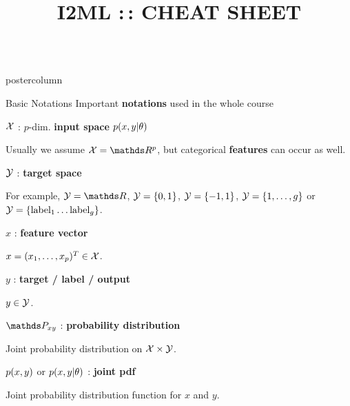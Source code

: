 \documentclass{beamer}
\title{I2ML :\,: CHEAT SHEET} %
\newlength{\columnheight} %
\begin{document}
\begin{frame}[fragile]{}
\begin{columns}
	\begin{column}{.31\textwidth}
		\begin{beamercolorbox}[center]{postercolumn}
			\begin{minipage}{.98\textwidth}
				\parbox[t][\columnheight]{\textwidth}{				
					\begin{myblock}{Basic Notations}
						Important \textbf{notations} used in the whole course  
						\\
						\begin{codebox}
						    $\mathcal{X}$ : $p$-dim. \textbf{input space} $p(x, y | \theta)$
						\end{codebox}
						\hspace*{1ex}Usually we assume $\Xspace = \R^p$, but categorical \textbf{features} can occur as well.
						\\
						\begin{codebox}
							$\mathcal{Y}$ : \textbf{target space}
						\end{codebox}
						\hspace*{1ex}For example, $\Yspace = \R$, $\mathcal{Y} = \lbrace 0, 1 \rbrace$, $\mathcal{Y} = \lbrace -1, 1 \rbrace$, $\mathcal{Y} = \{1, \ldots, g\}$ or \hspace*{1ex}$\mathcal{Y} = \lbrace \textrm{label}_1 \ldots \textrm{label}_g \rbrace$.
						\\
						\begin{codebox}
							$x$ : \textbf{feature vector}
						\end{codebox}
						\hspace*{1ex}$x = (x_1, \ldots, x_p)^T \in \mathcal{X}$.
						\\
						\begin{codebox}
							$y$ : \textbf{target / label / output}
						\end{codebox}
						\hspace*{1ex}$y \in \mathcal{Y}$.
						\\
						\begin{codebox}
							 $\P_{xy}$ : \textbf{probability distribution}
						\end{codebox}
						\hspace*{1ex}Joint probability distribution on $\mathcal{X} \times \mathcal{Y}$.
						\\
						\begin{codebox}
							$p(x,y)$ or $p(x, y | \theta)$ : \textbf{joint pdf}
						\end{codebox}
						\hspace*{1ex}Joint probability distribution function for $x$ and $y$.\\
						

\end{myblock}}
\end{minipage}
\end{beamercolorbox}
\end{column}
\end{columns}
\end{frame}
\end{document}
